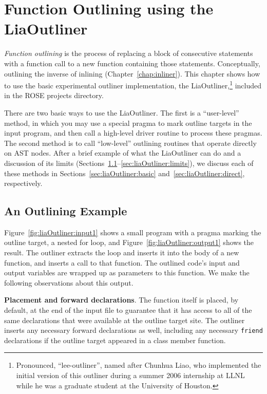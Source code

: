 \chapter{Function Outlining using the LiaOutliner}
\label{chap:outliner}

\emph{Function outlining} is the process of replacing a block of
consecutive statements with a function call to a new function
containing those statements. Conceptually, outlining the inverse of
inlining (Chapter~\ref{chap:inliner}). This chapter shows how to use
the basic experimental outliner implementation, the
LiaOutliner,\footnote{Pronounced, ``lee-outliner'', named after
Chunhua Liao, who implemented the initial version of this outliner
during a summer 2006 internship at LLNL while he was a graduate
student at the University of Houston.} included in the ROSE projects
directory.

There are two basic ways to use the LiaOutliner. The first is a
``user-level'' method, in which you may use a special pragma to mark
outline targets in the input program, and then call a high-level
driver routine to process these pragmas. The second method is to call
``low-level'' outlining routines that operate directly on AST nodes.
After a brief example of what the LiaOutliner can do and a discussion
of its limits
(Sections~\ref{sec:liaOutliner:example}--\ref{sec:liaOutliner:limits}),
we discuss each of these methods in
Sections~\ref{sec:liaOutliner:basic} and~\ref{sec:liaOutliner:direct},
respectively.

\section{An Outlining Example}
\label{sec:liaOutliner:example}

Figure~\ref{fig:liaOutliner:input1} shows a small program with a
pragma marking the outline target, a nested for loop, and
Figure~\ref{fig:liaOutliner:output1} shows the result. The outliner
extracts the loop and inserts it into the body of a new function, and
inserts a call to that function. The outlined code's input and output
variables are wrapped up as parameters to this function. We make the
following observations about this output.

\textbf{Placement and forward declarations}. The function itself is
placed, by default, at the end of the input file to guarantee that it
has access to all of the same declarations that were available at the
outline target site. The outliner inserts any necessary forward
declarations as well, including any necessary \texttt{friend}
declarations if the outline target appeared in a class member
function.

